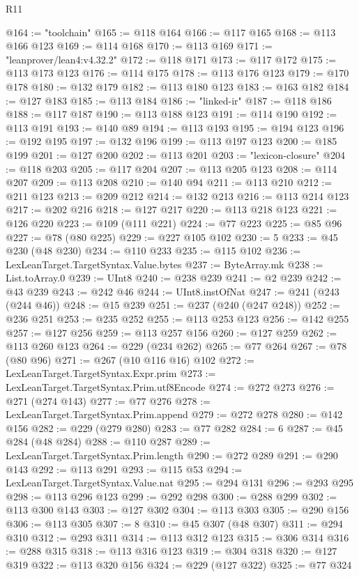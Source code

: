 \begin{lexlean}{R11}
\begin{coremodule}
{{{{{{{{{{{{{{{{{{{{{{{{{{{{{{{{{{{{{{{{{{{{{{{{{{{{{{{{{{{{{{{{{{{{{{{{{{{{{{{{{{{{{{{{{{{{{{{{{{{{{{{{{{@164 := "toolchain"
@165 := @118 @164
@166 := @117 @165
@168 := @113 @166 @123
@169 := @114 @168
@170 := @113 @169
@171 := "leanprover/lean4:v4.32.2"
@172 := @118 @171
@173 := @117 @172
@175 := @113 @173 @123
@176 := @114 @175
@178 := @113 @176 @123
@179 := @170 @178
@180 := @132 @179
@182 := @113 @180 @123
@183 := @163 @182
@184 := @127 @183
@185 := @113 @184
@186 := "linked-ir"
@187 := @118 @186
@188 := @117 @187
@190 := @113 @188 @123
@191 := @114 @190
@192 := @113 @191
@193 := @140 @89
@194 := @113 @193
@195 := @194 @123
@196 := @192 @195
@197 := @132 @196
@199 := @113 @197 @123
@200 := @185 @199
@201 := @127 @200
@202 := @113 @201
@203 := "lexicon-closure"
@204 := @118 @203
@205 := @117 @204
@207 := @113 @205 @123
@208 := @114 @207
@209 := @113 @208
@210 := @140 @94
@211 := @113 @210
@212 := @211 @123
@213 := @209 @212
@214 := @132 @213
@216 := @113 @214 @123
@217 := @202 @216
@218 := @127 @217
@220 := @113 @218 @123
@221 := @126 @220
@223 := @109 (@111 @221)
@224 := @77 @223
@225 := @85 @96
@227 := @78 (@80 @225)
@229 := @227 @105 @102
@230 := 5
@233 := @45 @230 (@48 @230)
@234 := @110 @233
@235 := @115 @102
@236 := LexLeanTarget.TargetSyntax.Value.bytes
@237 := ByteArray.mk
@238 := List.toArray.{0}
@239 := UInt8
@240 := @238 @239
@241 := @2 @239
@242 := @43 @239
@243 := @242 @46
@244 := UInt8.instOfNat
@247 := @241 (@243 (@244 @46))
@248 := @15 @239
@251 := @237 (@240 (@247 @248))
@252 := @236 @251
@253 := @235 @252
@255 := @113 @253 @123
@256 := @142 @255
@257 := @127 @256
@259 := @113 @257 @156
@260 := @127 @259
@262 := @113 @260 @123
@264 := @229 (@234 @262)
@265 := @77 @264
@267 := @78 (@80 @96)
@271 := @267 (@10 @116 @16) @102
@272 := LexLeanTarget.TargetSyntax.Expr.prim
@273 := LexLeanTarget.TargetSyntax.Prim.utf8Encode
@274 := @272 @273
@276 := @271 (@274 @143)
@277 := @77 @276
@278 := LexLeanTarget.TargetSyntax.Prim.append
@279 := @272 @278
@280 := @142 @156
@282 := @229 (@279 @280)
@283 := @77 @282
@284 := 6
@287 := @45 @284 (@48 @284)
@288 := @110 @287
@289 := LexLeanTarget.TargetSyntax.Prim.length
@290 := @272 @289
@291 := @290 @143
@292 := @113 @291
@293 := @115 @53
@294 := LexLeanTarget.TargetSyntax.Value.nat
@295 := @294 @131
@296 := @293 @295
@298 := @113 @296 @123
@299 := @292 @298
@300 := @288 @299
@302 := @113 @300 @143
@303 := @127 @302
@304 := @113 @303
@305 := @290 @156
@306 := @113 @305
@307 := 8
@310 := @45 @307 (@48 @307)
@311 := @294 @310
@312 := @293 @311
@314 := @113 @312 @123
@315 := @306 @314
@316 := @288 @315
@318 := @113 @316 @123
@319 := @304 @318
@320 := @127 @319
@322 := @113 @320 @156
@324 := @229 (@127 @322)
@325 := @77 @324
}}}}}}}}}}}}}}}}}}}}}}}}}}}}}}}}}}}}}}}}}}}}}}}}}}}}}}}}}}}}}}}}}}}}}}}}}}}}}}}}}}}}}}}}}}}}}}}}}}}}}}}}}}
\end{coremodule}
\end{lexlean}
